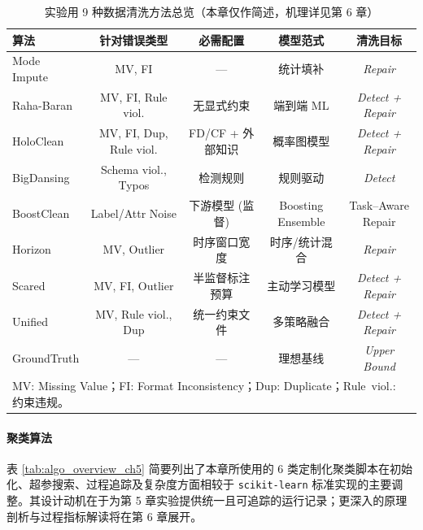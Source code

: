 \documentclass[10pt]{article} %
\numberwithin{equation}{section}
\begin{document}
\begin{table}[htbp]
\centering
\small
\renewcommand{\arraystretch}{1.15}
\setlength{\tabcolsep}{4pt}
\begin{tabular}{@{}lcccc@{}}
\toprule
\textbf{算法} & \textbf{针对错误类型} & \textbf{必需配置} &
\textbf{模型范式} & \textbf{清洗目标} \\
\midrule
Mode Impute & MV, FI & — &
统计填补 & \textit{Repair} \\

Raha-Baran & MV, FI, Rule viol. & 无显式约束 &
端到端 ML & \textit{Detect + Repair} \\

HoloClean & MV, FI, Dup, Rule viol. &
FD/CF + 外部知识 &
概率图模型 & \textit{Detect + Repair} \\

BigDansing & Schema viol., Typos &
检测规则 & 规则驱动 & \textit{Detect} \\

BoostClean & Label/Attr Noise &
下游模型 (监督) &
Boosting Ensemble & Task–Aware Repair \\

Horizon & MV, Outlier &
时序窗口宽度 &
时序/统计混合 & \textit{Repair} \\

Scared & MV, FI, Outlier &
半监督标注预算 &
主动学习模型 & \textit{Detect + Repair} \\

Unified & MV, Rule viol., Dup &
统一约束文件 &
多策略融合 & \textit{Detect + Repair} \\

GroundTruth & — & — &
理想基线 & \textit{Upper Bound} \\
\bottomrule
\multicolumn{5}{l}{\footnotesize
MV: Missing Value；FI: Format Inconsistency；Dup: Duplicate；Rule~viol.: 约束违规。}
\end{tabular}
\caption{实验用 9 种数据清洗方法总览（本章仅作简述，机理详见第 6 章）}
\label{tab:clean_algo_overview}
\end{table}

\vspace{-1em}

\paragraph{聚类算法}
\textcolor[rgb]{0.0,0.07,1.0}{%
表 \ref{tab:algo_overview_ch5} 简要列出了本章所使用的 6 类定制化聚类脚本在初始化、超参搜索、过程追踪及复杂度方面相较于 \texttt{scikit-learn} 标准实现的主要调整。其设计动机在于为第 5 章实验提供统一且可追踪的运行记录；更深入的原理剖析与过程指标解读将在第 6 章展开。}
\end{document}
